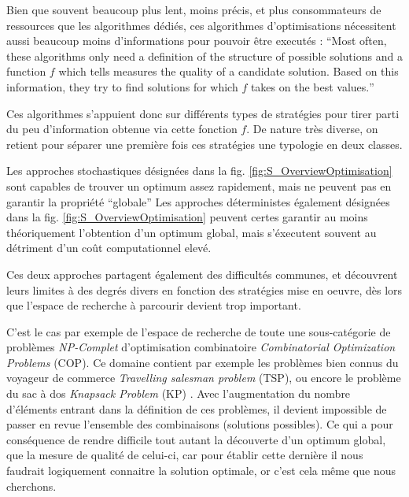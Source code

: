 Bien que souvent beaucoup plus lent, moins précis, et plus consommateurs de ressources que les algorithmes dédiés, ces algorithmes d'optimisations nécessitent aussi beaucoup moins d'informations pour pouvoir être executés : \foreignquote{english}{Most often, these algorithms only need a definition of the structure of possible solutions and a function $f$ which tells measures the quality of a candidate solution. Based on this information, they try to find solutions for which $f$ takes on the best values.} \autocite[24]{Weise2011}

Ces algorithmes s'appuient donc sur différents types de stratégies pour tirer parti du peu d'information obtenue via cette fonction $f$. De nature très diverse, on retient pour séparer une première fois ces stratégies une typologie en deux classes.

\begin{itemize}[label=\textbullet]
 Les approches stochastiques désignées dans la fig. \ref{fig:S_OverviewOptimisation} sont capables de trouver un optimum assez rapidement, mais ne peuvent pas en garantir la propriété \enquote{globale}
 Les approches déterministes également désignées dans la fig. \ref{fig:S_OverviewOptimisation} peuvent certes garantir au moins théoriquement l'obtention d'un optimum global, mais s'éxecutent souvent au détriment d'un coût computationnel elevé.
\end{itemize}

Ces deux approches partagent également des difficultés communes, et découvrent leurs limites à des degrés divers en fonction des stratégies mise en oeuvre, dès lors que l'espace de recherche à parcourir devient trop important.

C'est le cas par exemple de l'espace de recherche de toute une sous-catégorie de problèmes \textit{NP-Complet}  d'optimisation combinatoire \textit{Combinatorial Optimization Problems} (COP). Ce domaine contient par exemple les problèmes bien connus du voyageur de commerce \textit{Travelling salesman problem} (TSP), ou encore le problème du sac à dos \textit{Knapsack Problem} (KP) . Avec l'augmentation du nombre d'éléments entrant dans la définition de ces problèmes, il devient impossible de passer en revue l'ensemble des combinaisons (solutions possibles). Ce qui a pour conséquence de rendre difficile tout autant la découverte d'un optimum global, que la mesure de qualité de celui-ci, car pour établir cette dernière il nous faudrait logiquement connaitre la solution optimale, or c'est cela même que nous cherchons.

